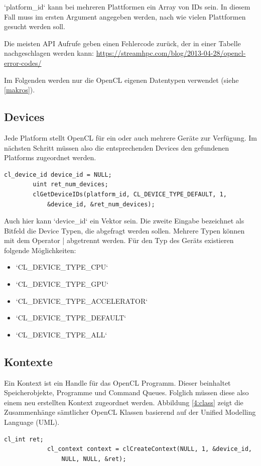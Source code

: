 			\li`platform_id` kann bei mehreren Plattformen ein Array von IDs sein. In diesem Fall muss im ersten Argument angegeben werden, nach wie vielen Plattformen gesucht werden soll.
			
			Die meisten \Gls{API} Aufrufe geben einen Fehlercode zurück, der in einer Tabelle nachgeschlagen werden kann: \url{https://streamhpc.com/blog/2013-04-28/opencl-error-codes/}
			
			Im Folgenden werden nur die OpenCL eigenen Datentypen verwendet (siehe \ref{makros}).
							
            \subsection{Devices}
            Jede \Gls{Platform} stellt OpenCL für ein oder auch mehrere Geräte zur Verfügung. Im nächsten Schritt müssen also die entsprechenden Devices den gefundenen \Glspl{Platform} zugeordnet werden.		
            \begin{lstlisting}[caption=Deviceabfrage]
        cl_device_id device_id = NULL;	
        uint ret_num_devices;
        clGetDeviceIDs(platform_id, CL_DEVICE_TYPE_DEFAULT, 1, 
            &device_id, &ret_num_devices);
            \end{lstlisting}
			
            Auch hier kann \li`device_id` ein Vektor sein. Die zweite Eingabe bezeichnet als Bitfeld die Device Typen, die abgefragt werden sollen. Mehrere Typen können mit dem Operator | abgetrennt werden. Für den Typ des Geräts existieren folgende Möglichkeiten:
						
            \begin{itemize}		
                \item \li`CL_DEVICE_TYPE_CPU`	
                \item \li`CL_DEVICE_TYPE_GPU`		
                \item \li`CL_DEVICE_TYPE_ACCELERATOR`		
                \item \li`CL_DEVICE_TYPE_DEFAULT`			
                \item \li`CL_DEVICE_TYPE_ALL`
            \end{itemize}
				
			\subsection{Kontexte}
			Ein \Gls{Kontext} ist ein \Gls{Handle} für das OpenCL Programm. Dieser beinhaltet Speicherobjekte, Programme und Command Queues. Folglich müssen diese also einem neu erstellten \Gls{Kontext} zugeordnet werden. Abbildung \ref{4:class} zeigt die Zusammenhänge sämtlicher OpenCL Klassen \autocite{oclRC} basierend auf der Unified Modelling Language (UML). \autocite{uml}
			\begin{lstlisting}[caption=Kontexte]
			cl_int ret;
			cl_context context = clCreateContext(NULL, 1, &device_id, 
				NULL, NULL, &ret);	
			\end{lstlisting}
			
